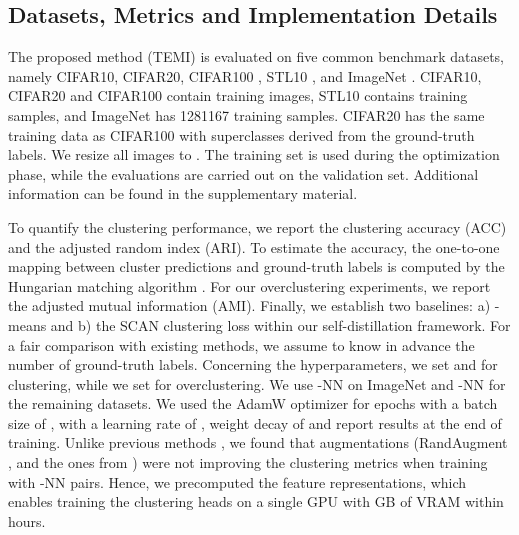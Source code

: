 \documentclass{bmvc2k}
\begin{document}
\subsection{Datasets, Metrics and Implementation Details}
The proposed method (TEMI) is evaluated on five common benchmark datasets, namely CIFAR10, CIFAR20, CIFAR100 \cite{cifar}, STL10 \cite{stl10}, and ImageNet \cite{deng2009imagenet}. CIFAR10, CIFAR20 and CIFAR100 contain  training images, STL10 contains  training samples, and ImageNet has \num{1281167} training samples. CIFAR20 has the same training data as CIFAR100 with  superclasses derived from the ground-truth labels. We resize all images to . The training set is used during the optimization phase, while the evaluations are carried out on the validation set. Additional information can be found in the supplementary material.

To quantify the clustering performance, we report the clustering accuracy (ACC) and the adjusted random index (ARI). To estimate the accuracy, the one-to-one mapping between cluster predictions and ground-truth labels is computed by the Hungarian matching algorithm \cite{kuhn1955hungarian}. For our overclustering experiments, we report the adjusted mutual information (AMI). Finally, we establish two baselines: a) -means and b) the SCAN clustering loss within our self-distillation framework. For a fair comparison with existing methods, we assume to know in advance the number of ground-truth labels. Concerning the hyperparameters, we set  and  for clustering, while we set  for overclustering. We use -NN on ImageNet and -NN for the remaining datasets. We used the AdamW optimizer \cite{adamw} for  epochs with a batch size of , with a learning rate of , weight decay of  and report results at the end of training. Unlike previous methods \cite{scan}, we found that augmentations (RandAugment \cite{cubuk2020randaugment}, and the ones from \cite{simclr}) were not improving the clustering metrics when training with -NN pairs. Hence, we precomputed the feature representations, which enables training the clustering heads on a single GPU with GB of VRAM within  hours.   
\end{document}
